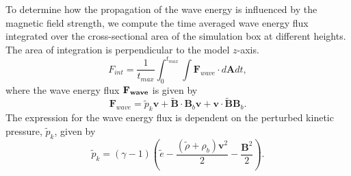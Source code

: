 \documentclass{aastex62}
\begin{document}













To determine how the propagation of the wave energy is influenced by the magnetic field strength, we compute the time averaged wave energy flux integrated over the cross-sectional area of the simulation box at different heights. The area of integration is perpendicular to the model $z$-axis.
\begin{equation}
F_{int}= \frac{1}{t_{max}} \int_{0}^{t_{max}} \int {\mathbf F}_{wave} \cdot d{\mathbf A}dt,
\label{e11}
\end{equation}
where the wave energy flux $\bf{F}_{wave}$ is given by
$$
{\mathbf F}_{wave}=\tilde{p}_{k} {\mathbf v}+\tilde{\mathbf B}\cdot {\mathbf B_{b}}{\mathbf v}+{\mathbf v}\cdot \tilde{\mathbf B}{\mathbf B_{b}} .
$$
The expression for the wave energy flux is dependent on the perturbed kinetic pressure, $\tilde{p}_{k}$, given by \citet{Bogdan2003}
$$
\tilde{p}_{k}=\left(\gamma - 1\right)\left( \tilde{e}-\frac{ \left( \tilde{\rho} +\rho_b \right){\mathbf v}^2}{2}-\frac{{\mathbf B}^2}{2}\right).
$$
\end{document}
